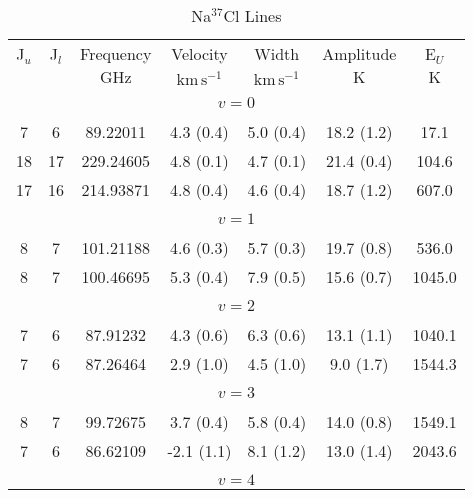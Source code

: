 \begin{table*}[htp]
\centering
\caption{Na$^{37}$Cl Lines}
\begin{tabular}{ccccccc}
\label{tab:Na37Cl_salt_lines}
 J$_u$ & J$_l$ & Frequency & Velocity & Width & Amplitude & E$_U$ \\
  &  & $\mathrm{GHz}$ & $\mathrm{km\,s^{-1}}$ & $\mathrm{km\,s^{-1}}$ & $\mathrm{K}$ & $\mathrm{K}$ \\
\hline
&\vspace{-0.75em}\\
\multicolumn{7}{c}{$v = 0$} \\
\vspace{-0.75em}\\
 7 & 6 & 89.22011 & 4.3 (0.4) & 5.0 (0.4) & 18.2 (1.2) & 17.1 \\
 18 & 17 & 229.24605 & 4.8 (0.1) & 4.7 (0.1) & 21.4 (0.4) & 104.6 \\
 17 & 16 & 214.93871 & 4.8 (0.4) & 4.6 (0.4) & 18.7 (1.2) & 607.0 \\
&\vspace{-0.75em}\\
\multicolumn{7}{c}{$v = 1$} \\
\vspace{-0.75em}\\
 8 & 7 & 101.21188 & 4.6 (0.3) & 5.7 (0.3) & 19.7 (0.8) & 536.0 \\
 8 & 7 & 100.46695 & 5.3 (0.4) & 7.9 (0.5) & 15.6 (0.7) & 1045.0 \\
&\vspace{-0.75em}\\
\multicolumn{7}{c}{$v = 2$} \\
\vspace{-0.75em}\\
 7 & 6 & 87.91232 & 4.3 (0.6) & 6.3 (0.6) & 13.1 (1.1) & 1040.1 \\
 7 & 6 & 87.26464 & 2.9 (1.0) & 4.5 (1.0) & 9.0 (1.7) & 1544.3 \\
&\vspace{-0.75em}\\
\multicolumn{7}{c}{$v = 3$} \\
\vspace{-0.75em}\\
 8 & 7 & 99.72675 & 3.7 (0.4) & 5.8 (0.4) & 14.0 (0.8) & 1549.1 \\
 7 & 6 & 86.62109 & -2.1 (1.1) & 8.1 (1.2) & 13.0 (1.4) & 2043.6 \\
&\vspace{-0.75em}\\
\multicolumn{7}{c}{$v = 4$} \\

\end{tabular}
\end{table*}
